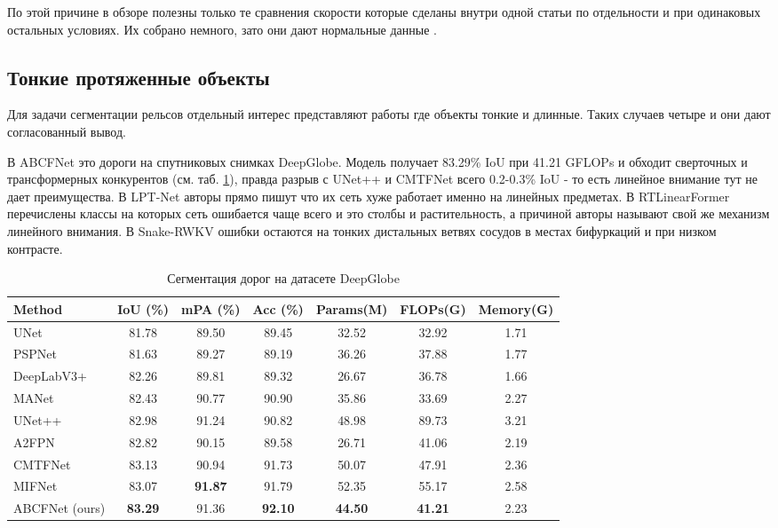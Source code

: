 \documentclass[areasetadvanced]{scrartcl}
\begin{document}
		По этой причине в обзоре полезны только те сравнения скорости которые сделаны внутри одной статьи по отдельности и при одинаковых остальных условиях.
		 Их собрано немного, зато они дают нормальные данные \cite{glanet, abcfnet, cltmambaseg, mlformer, rtlinearformer, hlsmvit, pmp}.

	\subsection{Тонкие протяженные объекты}
		Для задачи сегментации рельсов отдельный интерес представляют работы где объекты тонкие и длинные. Таких случаев четыре и они дают согласованный
		вывод.

		В ABCFNet \cite{abcfnet} это дороги на спутниковых снимках DeepGlobe. Модель получает 83.29\% IoU при 41.21 GFLOPs и обходит сверточных и
		трансформерных конкурентов (см. таб. \ref{tab:abcfnet3}), правда разрыв с UNet++ и CMTFNet всего 0.2-0.3\% IoU - то есть линейное внимание тут не
		дает преимущества. В LPT-Net \cite{lptnet} авторы прямо пишут что их сеть хуже работает именно на линейных предметах.
		В RTLinearFormer \cite{rtlinearformer} перечислены классы на которых сеть ошибается чаще всего и это столбы и растительность, а причиной авторы
		называют свой же механизм линейного внимания. В Snake-RWKV \cite{snakerwkv} ошибки остаются на тонких дистальных ветвях сосудов в местах
		бифуркаций и при низком контрасте.

		\begin{table}[H]
			\centering
			\footnotesize
			\caption{Сегментация дорог на датасете DeepGlobe \cite{abcfnet}}
			\label{tab:abcfnet3}
			\begin{adjustbox}{max width=\linewidth}
			\begin{tabular}{lcccccc}
				\toprule
				Method & IoU (\%) & mPA (\%) & Acc (\%) & Params(M) & FLOPs(G) & Memory(G) \\
				\midrule
				UNet & 81.78 & 89.50 & 89.45 & 32.52 & 32.92 & 1.71 \\
				PSPNet & 81.63 & 89.27 & 89.19 & 36.26 & 37.88 & 1.77 \\
				DeepLabV3+ & 82.26 & 89.81 & 89.32 & 26.67 & 36.78 & 1.66 \\
				MANet & 82.43 & 90.77 & 90.90 & 35.86 & 33.69 & 2.27 \\
				UNet++ & 82.98 & 91.24 & 90.82 & 48.98 & 89.73 & 3.21 \\
				A2FPN & 82.82 & 90.15 & 89.58 & 26.71 & 41.06 & 2.19 \\
				CMTFNet & 83.13 & 90.94 & 91.73 & 50.07 & 47.91 & 2.36 \\
				MIFNet & 83.07 & \textbf{91.87} & 91.79 & 52.35 & 55.17 & 2.58 \\
				\midrule
				ABCFNet (ours) & \textbf{83.29} & 91.36 & \textbf{92.10} & \textbf{44.50} & \textbf{41.21} & 2.23 \\
				\bottomrule
			\end{tabular}
			\end{adjustbox}
		\end{table}
\end{document}
